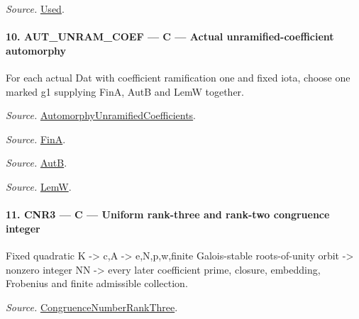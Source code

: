 \documentclass[11pt,a4paper]{article}
\numberwithin{equation}{section}
\theoremstyle{remark}\newtheorem{remark}[theorem]{Remark}
\begin{document}
\emph{Source.} \href{https://github.com/CocoSgt/riemann-hypothesis-lean/blob/7cbf7a0c32fca1badf05931879a37c3f8a2b03b4/src/Development/AutomorphicArithmetic/AutomorphicVarieties/ModularityArgument/KatoQuadraticCharacters/KatoTwoOfUseN.lean#L11-L41}{Used}.



\paragraph{10. AUT\_\allowbreak UNRAM\_\allowbreak COEF — C — Actual unramified-coefficient automorphy}

For each actual Dat with coefficient ramification one and fixed iota, choose one marked g1 supplying FinA, AutB and LemW together.

\emph{Source.} \href{https://github.com/CocoSgt/riemann-hypothesis-lean/blob/7cbf7a0c32fca1badf05931879a37c3f8a2b03b4/src/Development/AutomorphicArithmetic/AutomorphicVarieties/AutomorphicCases/AutomorphyUnramifiedCoefficients.lean#L24-L27}{AutomorphyUnramifiedCoefficients}.

\emph{Source.} \href{https://github.com/CocoSgt/riemann-hypothesis-lean/blob/7cbf7a0c32fca1badf05931879a37c3f8a2b03b4/src/Development/AutomorphicArithmetic/AutomorphicVarieties/AutomorphicCases/AutomorphyUnramifiedCoefficients.lean#L12-L13}{FinA}.

\emph{Source.} \href{https://github.com/CocoSgt/riemann-hypothesis-lean/blob/7cbf7a0c32fca1badf05931879a37c3f8a2b03b4/src/Development/AutomorphicArithmetic/AutomorphicVarieties/AutomorphicCases/AutomorphyUnramifiedCoefficients.lean#L15-L17}{AutB}.

\emph{Source.} \href{https://github.com/CocoSgt/riemann-hypothesis-lean/blob/7cbf7a0c32fca1badf05931879a37c3f8a2b03b4/src/Development/AutomorphicArithmetic/AutomorphicVarieties/AutomorphicCases/AutomorphyUnramifiedCoefficients.lean#L19-L22}{LemW}.



\paragraph{11. CNR3 — C — Uniform rank-three and rank-two congruence integer}

Fixed quadratic K -> c,A -> e,N,p,w,finite Galois-stable roots-of-unity orbit -> nonzero integer NN -> every later coefficient prime, closure, embedding, Frobenius and finite admissible collection.

\emph{Source.} \href{https://github.com/CocoSgt/riemann-hypothesis-lean/blob/7cbf7a0c32fca1badf05931879a37c3f8a2b03b4/src/Development/AutomorphicArithmetic/AutomorphicVarieties/AutomorphicForms/CongruenceNumberRankThree.lean#L125-L140}{CongruenceNumberRankThree}.
\end{document}
